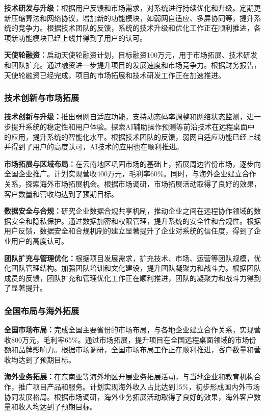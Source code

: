 \documentclass[12pt,a4paper]{article}
\begin{document}
\textbf{技术研发与升级：}根据用户反馈和市场需求，对系统进行持续优化和升级。定期更新压缩算法和网络协议，增加新的功能模块，如弱网自适应、多屏协同等，提升系统的竞争力。根据技术团队的反馈，系统的技术升级和优化工作正在顺利推进，各项新功能模块已经上线并得到了用户的认可。

\textbf{天使轮融资：}启动天使轮融资计划，目标融资100万元，用于市场拓展、技术研发和团队扩充。通过融资进一步提升项目的发展速度和市场竞争力。根据财务报告，天使轮融资已经完成，项目的市场拓展和技术研发工作正在加速推进。

\subsubsection{技术创新与市场拓展}
\textbf{技术创新与升级：}推出弱网自适应功能，支持动态码率调整和网络状态监测，进一步提升系统的稳定性和用户体验。探索AI辅助操作预测等前沿技术在远程桌面中的应用，提升系统的智能化水平。根据技术团队的反馈，弱网自适应功能已经上线并得到了用户的高度认可，AI技术的应用也在顺利推进。

\textbf{市场拓展与区域布局：}在云南地区巩固市场的基础上，拓展周边省份市场，逐步向全国企业推广。计划实现营收400万元，毛利率60\%。同时，与海外企业建立合作关系，探索海外市场拓展机会。根据市场调研，市场拓展活动取得了良好的效果，客户数量和营收均达到了预期目标。

\textbf{数据安全与合规：}研究企业数据合规共享机制，推动企业之间在远程协作领域的数据安全和隐私保护。通过数据加密和权限管理，提升系统的安全性和合规性。根据用户反馈，数据安全和合规机制的建立显著提升了企业对系统的信任度，得到了企业用户的高度认可。

\textbf{团队扩充与管理优化：}根据项目发展需求，扩充技术、市场、运营等团队规模，优化团队管理结构。加强团队培训和文化建设，提升团队凝聚力和战斗力。根据团队成员的反馈，团队扩充和管理优化工作正在顺利推进，团队的凝聚力和战斗力得到了显著提升。

\subsubsection{全国布局与海外拓展}
\textbf{全国市场布局：}完成全国主要省份的市场布局，与各地企业建立合作关系，实现营收800万元，毛利率65\%。通过市场拓展，提升项目在全国远程桌面领域的市场份额和品牌影响力。根据市场调研，全国市场布局工作正在顺利推进，客户数量和营收均达到了预期目标。

\textbf{海外业务拓展：}在东南亚等海外地区开展业务拓展活动，与当地企业和教育机构合作，推广项目产品和服务。计划实现海外收入占比达到15\%，初步形成国内外市场协同发展格局。根据市场调研，海外业务拓展活动取得了良好的效果，海外客户数量和收入均达到了预期目标。
\end{document}
